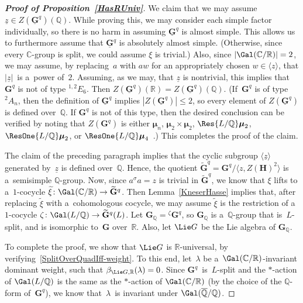 \begin{proof}[\bf Proof of Proposition~\ref{HasRUniv}]
We claim that we may assume $\underline z \in Z(\underline{\mathbf{G}}^q)(\mathbb{Q})$.
While proving this, we may consider each simple factor individually, so there is no harm in assuming
$\underline{\mathbf{G}}^q$ is almost simple.
This allows us to furthermore assume that $\underline{\mathbf{G}}^q$ is absolutely almost simple.
(Otherwise, since every $\mathbb{C}$-group is split, we could assume $\xi$ is trivial.) Also, since
$|{\Gal(\mathbb{C}/\mathbb{R})}| = 2$, we may assume, by replacing~$a$ with $aw$ for an appropriately chosen $w \in
\langle z \rangle$, that $|\underline z|$~is a~power of~$2$.
Assuming, as we may, that $\underline z$ is nontrivial, this implies that $\mathbf{G}^q$ is not of type ${}^{1,2} E_6$.
Then $Z(\underline{\mathbf{G}}^q)(\mathbb{R}) = Z(\underline{\mathbf{G}}^q)(\mathbb{Q})$.
(If~$\mathbf{G}^q$ is of type ${}^2 A_n$, then the def\/inition of $\underline{\mathbf{G}}^q$ implies
$|Z(\underline{\mathbf{G}}^q)| \le 2$, so every element of $Z(\underline{\mathbf{G}}^q)$ is def\/ined over~$\mathbb{Q}$.
If $\mathbf{G}^q$ is not of this type, then the desired conclusion can be verif\/ied by noting that $Z(\mathbf{G}^q)$ is
either $\boldsymbol\mu_n$, $\boldsymbol\mu_2 \times \boldsymbol\mu_2$, $\Res{L/\mathbb{Q}} \boldsymbol\mu_2$,
$\ResOne{L/\mathbb{Q}} \boldsymbol\mu_2$, or $\ResOne{L/\mathbb{Q}}
\boldsymbol\mu_4$~\cite[p.~332]{PlatonovRapinchukBook}.) This completes the proof of the claim.

The claim of the preceding paragraph implies that the cyclic subgroup $\langle \underline z \rangle$ generated
by~$\underline z$ is def\/ined over~$\mathbb{Q}$.
Hence, the quotient $\widetilde{\mathbf{G}}^q = \mathbf{G}^q/\langle z, Z(\mathbf{H})^2 \rangle$ is a~semisimple
$\mathbb{Q}$-group.
Now, since $a {}^\sigma a = z$ is trivial in $\widetilde{\mathbf{G}}^q$, we know that $\xi$ lifts to a~$1$-cocycle
$\widetilde\xi \colon \Gal(\mathbb{C}/\mathbb{R}) \to \widetilde{\mathbf{G}}^q$.
Then Lemma~\ref{KneserHasse} implies that, after replacing $\widetilde\xi$ with a~cohomologous cocycle, we may assume
$\widetilde\xi$ is the restriction of a~$1$-cocycle $\zeta \colon \Gal(L/\mathbb{Q}) \to \widetilde{\mathbf{G}}^q(L)$.
Let $\mathbf{G}_\mathbb{Q} = {}^\zeta \mathbf{G}^q$, so $\mathbf{G}_\mathbb{Q}$ is a~$\mathbb{Q}$-group that
is~$L$-split, and is isomorphic to~$\mathbf{G}$ over~$\mathbb{R}$.
Also, let $\Lie G$ be the Lie algebra of $\mathbf{G}_\mathbb{Q}$.

To complete the proof, we show that $\Lie G$ is $\mathbb{R}$-universal, by verifying~\eqref{SplitOverQuadIff-weight}.
To this end, let~$\lambda$ be a~$\Gal(\mathbb{C}/\mathbb{R})$-invariant dominant weight, such that $\beta_{\Lie
G,\mathbb{R}}(\lambda) = 0$.
Since $\mathbf{G}^q$~is~$L$-split and the $*$-action of $\Gal(L/\mathbb{Q})$ is the same as the $*$-action of
$\Gal(\mathbb{C}/\mathbb{R})$ (by the choice of the $\mathbb{Q}$-form of~$\mathbf{G}^q$), we know that~$\lambda$~is
invariant under $\Gal(\overline{\mathbb{Q}}/\mathbb{Q})$.


\end{proof}
